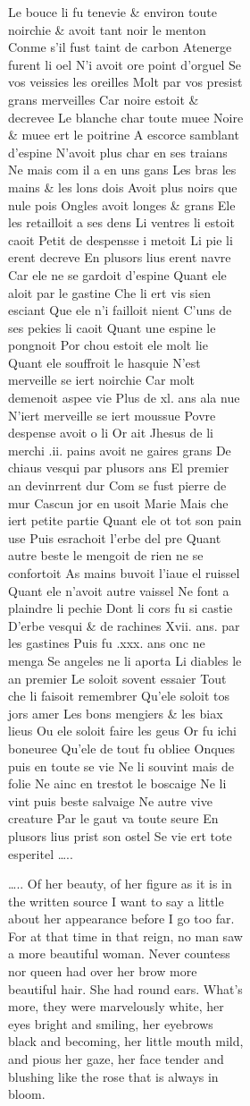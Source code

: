 \documentclass[
  letterpaper,
  DIV=11,
  numbers=noendperiod,
  oneside]{scrreprt}
\begin{document}
\begin{figure}
\begin{figure}
\begin{figure}
\begin{minipage}{0.20\linewidth}
Le bouce li fu tenevie \& environ toute {noirchie} \& avoit tant {noir}
le menton {Conme s'il fust {taint de carbon}} {Atenerge} furent li oel
N'i avoit ore point d'orguel Se vos veissies les oreilles Molt par vos
presist grans merveilles Car {noire} estoit \& decrevee {Le {blanche}
char toute muee} {Noire} \& {muee} ert le poitrine A escorce samblant
d'espine N'avoit plus char en ses traians Ne mais com il a en uns gans
Les bras les mains \& les lons dois Avoit {plus noirs que nule pois}
Ongles avoit longes \& grans Ele les retailloit a ses dens Li ventres li
estoit caoit Petit de despensse i metoit Li pie li erent decreve En
plusors lius erent navre Car ele ne se gardoit d'espine Quant ele aloit
par le gastine Che li ert vis sien esciant Que ele n'i failloit nient
C'uns de ses pekies li caoit Quant une espine le pongnoit Por chou
estoit ele molt lie Quant ele souffroit le hasquie N'est merveille se
iert {noirchie} Car molt demenoit aspee vie Plus de xl. ans ala nue
N'iert merveille se iert moussue Povre despense avoit o li Or ait Jhesus
de li merchi .ii. pains avoit ne gaires grans De chiaus vesqui par
plusors ans El premier an devinrrent dur Com se fust pierre de mur
Cascun jor en usoit Marie Mais che iert petite partie Quant ele ot tot
son pain use Puis esrachoit l'erbe del pre Quant autre beste le mengoit
de rien ne se confortoit {As mains} buvoit l'iaue el ruissel Quant ele
n'avoit autre vaissel Ne font a plaindre li pechie Dont li cors fu si
castie D'erbe vesqui \& de rachines Xvii. ans. par les gastines Puis fu
.xxx. ans onc ne menga Se angeles ne li aporta Li diables le an premier
Le soloit sovent essaier Tout che li faisoit remembrer Qu'ele soloit tos
jors amer Les bons mengiers \& les biax lieus Ou ele soloit faire les
geus Or fu ichi boneuree Qu'ele de tout fu obliee Onques puis en toute
se vie Ne li souvint mais de folie Ne ainc en trestot le boscaige Ne li
vint puis beste salvaige Ne autre vive creature Par le gaut va toute
seure En plusors lius prist son ostel Se vie ert tote esperitel \ldots..

\ldots.. Of her beauty, of her figure as it is in the written source I
want to say a little about her appearance before I go too far. For at
that time in that reign, no man saw a more beautiful woman. Never
countess nor queen had over her brow more beautiful hair. She had round
ears. What's more, they were marvelously {white}, {her eyes {bright} and
smiling,} {her eyebrows {black} and becoming,} her little mouth mild,
and pious her gaze, her face tender and {blushing} {like the rose that
is always in bloom.}


\end{minipage}
\end{figure}
\end{figure}
\end{figure}
\end{document}
